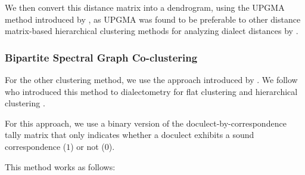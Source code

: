 \documentclass[a4paper]{article}
\begin{document}
We then convert this distance matrix into a dendrogram,
using the UPGMA method introduced by \citet{sokal1958statistical},
as UPGMA was found to be preferable to other
distance matrix-based hierarchical clustering methods
for analyzing dialect distances by \citet{heeringa2004measuring}.


\subsubsection{Bipartite Spectral Graph Co-clustering}

For the other clustering method, we use the approach
introduced by \citet{dhillon2001co-clustering}.
We follow \citeauthor*{wieling2009bipartite} who introduced
this method to dialectometry for flat clustering \citeyearpar{wieling2009bipartite} and hierarchical clustering \citeyearpar{wieling2010hierarchical}.

For this approach, we use a binary version of the
doculect-by-correspondence tally matrix that only
indicates whether a doculect exhibits
a sound correspondence ($1$) or not ($0$).

This method works as follows:
\end{document}
